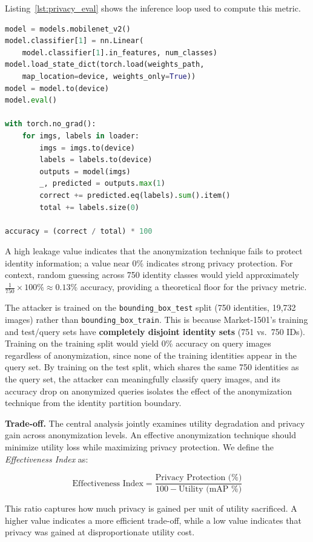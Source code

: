 \noindent Listing~\ref{lst:privacy_eval} shows the inference loop used to compute this metric.

\begin{lstlisting}[language=Python, caption={Privacy evaluation inference loop (\texttt{evaluate\_privacy.py}).}, label=lst:privacy_eval]
model = models.mobilenet_v2()
model.classifier[1] = nn.Linear(
    model.classifier[1].in_features, num_classes)
model.load_state_dict(torch.load(weights_path,
    map_location=device, weights_only=True))
model = model.to(device)
model.eval()

with torch.no_grad():
    for imgs, labels in loader:
        imgs = imgs.to(device)
        labels = labels.to(device)
        outputs = model(imgs)
        _, predicted = outputs.max(1)
        correct += predicted.eq(labels).sum().item()
        total += labels.size(0)

accuracy = (correct / total) * 100
\end{lstlisting}

A high leakage value indicates that the anonymization technique fails to protect identity information; a value near 0\% indicates strong privacy protection. For context, random guessing across 750 identity classes would yield approximately $\frac{1}{750} \times 100\% \approx 0.13\%$ accuracy, providing a theoretical floor for the privacy metric.

The attacker is trained on the \texttt{bounding\_box\_test} split (750 identities, 19,732 images) rather than \texttt{bounding\_box\_train}. This is because Market-1501's training and test/query sets have \textbf{completely disjoint identity sets} (751 vs.\ 750 IDs). Training on the training split would yield 0\% accuracy on query images regardless of anonymization, since none of the training identities appear in the query set. By training on the test split, which shares the same 750 identities as the query set, the attacker can meaningfully classify query images, and its accuracy drop on anonymized queries isolates the effect of the anonymization technique from the identity partition boundary.

\textbf{Trade-off.} The central analysis jointly examines utility degradation and privacy gain across anonymization levels. An effective anonymization technique should minimize utility loss while maximizing privacy protection. We define the \textit{Effectiveness Index} as:

\begin{equation}
    \text{Effectiveness Index} = \frac{\text{Privacy Protection (\%)}}{100 - \text{Utility (mAP \%)}}
    \label{eq:effectiveness}
\end{equation}

This ratio captures how much privacy is gained per unit of utility sacrificed. A higher value indicates a more efficient trade-off, while a low value indicates that privacy was gained at disproportionate utility cost.
